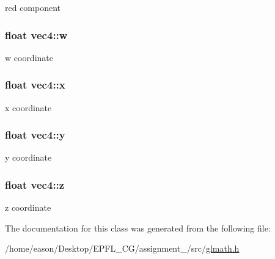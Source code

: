 red component 

\subsubsection[{\texorpdfstring{w}{w}}]{\setlength{\rightskip}{0pt plus 5cm}float vec4\+::w}\hypertarget{classvec4_a0c92fe67e490d9768217a00c2e8abd49}{}\label{classvec4_a0c92fe67e490d9768217a00c2e8abd49}


w coordinate 

\subsubsection[{\texorpdfstring{x}{x}}]{\setlength{\rightskip}{0pt plus 5cm}float vec4\+::x}\hypertarget{classvec4_a36c650782a67137380c83b01545c94d6}{}\label{classvec4_a36c650782a67137380c83b01545c94d6}


x coordinate 

\subsubsection[{\texorpdfstring{y}{y}}]{\setlength{\rightskip}{0pt plus 5cm}float vec4\+::y}\hypertarget{classvec4_a7328fe0e502fce92fa32016193052e92}{}\label{classvec4_a7328fe0e502fce92fa32016193052e92}


y coordinate 

\subsubsection[{\texorpdfstring{z}{z}}]{\setlength{\rightskip}{0pt plus 5cm}float vec4\+::z}\hypertarget{classvec4_a12b318751110db034dddc450cdec455d}{}\label{classvec4_a12b318751110db034dddc450cdec455d}


z coordinate 



The documentation for this class was generated from the following file\+:\begin{DoxyCompactItemize}
\item 
/home/eason/\+Desktop/\+E\+P\+F\+L\+\_\+\+C\+G/assignment\+\_/src/\hyperlink{glmath_8h}{glmath.\+h}\end{DoxyCompactItemize}
